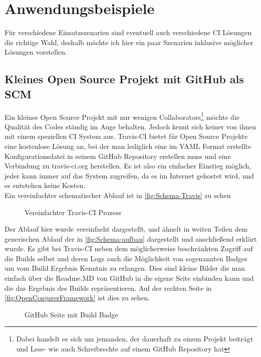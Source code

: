 \pagebreak

\chapter{Anwendungsbeispiele}
Für verschiedene Einsatzszenarien sind eventuell auch verschiedene CI Lösungen die richtige Wahl, deshalb möchte ich hier ein paar Szenarien inklusive möglicher Lösungen vorstellen.
\section{Kleines Open Source Projekt mit GitHub als SCM}
Ein kleines Open Source Projekt mit nur wenigen Collaborators\footnote{Dabei handelt es sich um jemanden, der dauerhaft zu einem Projekt beiträgt und Lese- wie auch Schreibrechte auf einem GitHub Repository hat} möchte die Qualität des Codes ständig im Auge behalten. Jedoch kennt sich keiner von ihnen mit einem speziellen CI System aus. Travis-CI bietet für Open Source Projekte eine kostenlose Lösung an, bei der man lediglich eine im YAML Format erstellte Konfigurationsdatei in seinem GitHub Repository erstellen muss und eine Verbindung zu travis-ci.org herstellen. Es ist also ein einfacher Einstieg möglich, jeder kann immer auf das System zugreifen, da es im Internet gehostet wird, und es entstehen keine Kosten.\\
Ein vereinfachter schematischer Ablauf ist in \autoref{fig:Schema-Travis} zu sehen
\begin{figure}[H]
  \centering
  \caption{Vereinfachter Travis-CI Prozess}\label{fig:Schema-Travis}
\end{figure}
Der Ablauf hier wurde vereinfacht dargestellt, und ähnelt in weiten Teilen dem generischen Ablauf der in \autoref{fig:Schema-aufbau} dargestellt und anschließend erklärt wurde. Es gibt bei Travis-CI neben dem möglicherweise beschränkten Zugriff auf die Builds selbst und deren Logs auch die Möglichkeit von sogenannten Badges um vom Build Ergebnis Kenntnis zu erlangen. Dies sind kleine Bilder die man einfach über die Readme.MD von GitHub in die eigene Seite einbinden kann und die das Ergebnis des Builds repräsentieren. Auf der rechten Seite in \autoref{fig:OpenConjurerFramework} ist dies zu sehen.
\begin{figure}[H]
  \centering
  \caption{GitHub Seite mit Build Badge}\label{fig:OpenConjurerFramework}
\end{figure}
